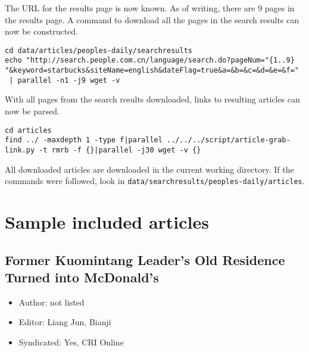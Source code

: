 The URL for the results page is now known. As of writing, there are 9 pages in
the results page. A command to download all the pages in the search results can
now be constructed.
\begin{verbatim}
cd data/articles/peoples-daily/searchresults
echo "http://search.people.com.cn/language/search.do?pageNum="{1..9}
"&keyword=starbucks&siteName=english&dateFlag=true&a=&b=&c=&d=&e=&f="
 | parallel -n1 -j9 wget -v
\end{verbatim}
With all pages from the search results downloaded, links to resulting articles
can now be parsed.
\begin{verbatim}
cd articles
find ../ -maxdepth 1 -type f|parallel ../../../script/article-grab-link.py -t rmrb -f {}|parallel -j30 wget -v {}
\end{verbatim}
All downloaded articles are downloaded in the current working directory. If the
commands were followed, look in
\texttt{data/searchresults/peoples-daily/articles}.

\chapter{Sample included articles}\label{appdx:news-articles-inc}

\section{Former Kuomintang Leader's Old Residence Turned into
McDonald's}

\begin{itemize}
	\item Author: not listed
	\item Editor: Liang Jun, Bianji
	\item Syndicated: Yes, CRI Online
\end{itemize}


